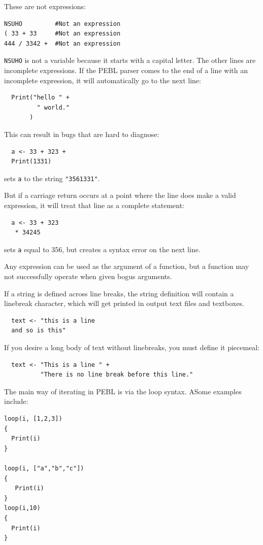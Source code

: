 These are not expressions:
\begin{verbatim}
NSUHO         #Not an expression
( 33 + 33     #Not an expression
444 / 3342 +  #Not an expression
\end{verbatim}
\texttt{NSUHO} is not a variable because it starts with a capital
letter. The other lines are incomplete expressions.  If the PEBL parser comes
to the end of a line with an incomplete expression, it
will automatically go to the next line:
\begin{verbatim}
  Print("hello " +
         " world."
       )
\end{verbatim}
This can result in bugs that are hard to diagnose:
\begin{verbatim}
  a <- 33 + 323 +
  Print(1331)
\end{verbatim}
sets \texttt{a} to the string \texttt{"3561331"}.

But if a carriage return occurs at a point where the
line does make a valid expression, it will treat that line as a complete statement:
\begin{verbatim}
  a <- 33 + 323
   * 34245
\end{verbatim}
sets \texttt{a} equal to 356, but creates a syntax error on the next line.

Any expression can be used as the argument of a function, but a
function may not successfully operate when given bogus arguments.


If a string is defined across line breaks, the string definition will
contain a linebreak character, which will get printed in output text
files and textboxes.

\begin{verbatim}
  text <- "this is a line
  and so is this"
\end{verbatim}
If you desire a long body of text without linebreaks, you must define it piecemeal:
\begin{verbatim}
  text <- "This is a line " +
          "There is no line break before this line."
\end{verbatim}



The main way of iterating in PEBL is via the loop syntax.  ASome examples include:

\begin{verbatim}
loop(i, [1,2,3])
{
  Print(i)
}

loop(i, ["a","b","c"])
{
   Print(i)
}
loop(i,10)
{
  Print(i)
}
\end{verbatim}

